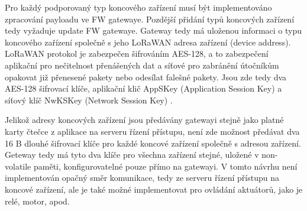     

Pro každý podporovaný typ koncového zařízení musí být implementováno zpracování payloadu ve FW gatewaye. Pozdější přidání typů koncových zařízení tedy vyžaduje update FW gatewaye.
Gateway tedy má uloženou informaci o typu koncového zařízení společně s jeho LoRaWAN adresa zařízení (device address).
LoRaWAN protokol je zabezpečen šifrováním AES-128, a to zabezpečení aplikační pro nečitelnost přenášených dat a síťové pro zabránění útočníkům opakovat již přenesené pakety nebo odesílat falešné pakety. Jsou zde tedy dva AES-128 šifrovací klíče, aplikační klič AppSKey (Application Session Key) a síťový klíč NwKSKey (Network Session Key) \cite{lorawan_specification}.

Jelikož adresy koncových zařízení jsou předávány gatewayi stejně jako platné karty čtečce z aplikace na serveru řízení přístupu, není zde možnost předávat dva 16 B dlouhé šifrovací klíče pro každé koncové zařízení společně s adresou zařízení. Geteway tedy má tyto dva klíče pro všechna zařízení stejné, uložené v non-volatile paměti, konfigurovatelné pouze přímo na gatewayi.
V tomto návrhu není implementován opačný směr komunikace, tedy ze serveru řízení přístupu na koncové zařízení, ale je také možné implementovat pro ovládání aktuátorů, jako je relé, motor, apod.


